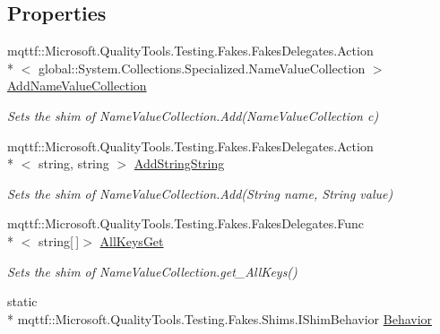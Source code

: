 \subsection*{Properties}
\begin{DoxyCompactItemize}
\item 
mqttf\-::\-Microsoft.\-Quality\-Tools.\-Testing.\-Fakes.\-Fakes\-Delegates.\-Action\\*
$<$ global\-::\-System.\-Collections.\-Specialized.\-Name\-Value\-Collection $>$ \hyperlink{class_system_1_1_collections_1_1_specialized_1_1_fakes_1_1_shim_name_value_collection_a87e4e2b920558c0934a3d0c88d0f5fdb}{Add\-Name\-Value\-Collection}
\begin{DoxyCompactList}\small\item\em Sets the shim of Name\-Value\-Collection.\-Add(\-Name\-Value\-Collection c)\end{DoxyCompactList}\item 
mqttf\-::\-Microsoft.\-Quality\-Tools.\-Testing.\-Fakes.\-Fakes\-Delegates.\-Action\\*
$<$ string, string $>$ \hyperlink{class_system_1_1_collections_1_1_specialized_1_1_fakes_1_1_shim_name_value_collection_ae9b8242856e0aa0a92fca2c19e1505ee}{Add\-String\-String}
\begin{DoxyCompactList}\small\item\em Sets the shim of Name\-Value\-Collection.\-Add(\-String name, String value)\end{DoxyCompactList}\item 
mqttf\-::\-Microsoft.\-Quality\-Tools.\-Testing.\-Fakes.\-Fakes\-Delegates.\-Func\\*
$<$ string\mbox{[}$\,$\mbox{]}$>$ \hyperlink{class_system_1_1_collections_1_1_specialized_1_1_fakes_1_1_shim_name_value_collection_aee4ca68285522ac58dcc1983b60dc58a}{All\-Keys\-Get}
\begin{DoxyCompactList}\small\item\em Sets the shim of Name\-Value\-Collection.\-get\-\_\-\-All\-Keys()\end{DoxyCompactList}\item 
static \\*
mqttf\-::\-Microsoft.\-Quality\-Tools.\-Testing.\-Fakes.\-Shims.\-I\-Shim\-Behavior \hyperlink{class_system_1_1_collections_1_1_specialized_1_1_fakes_1_1_shim_name_value_collection_a488a2ba323e49b9fc574323385ac5fe7}{Behavior}

\end{DoxyCompactItemize}
